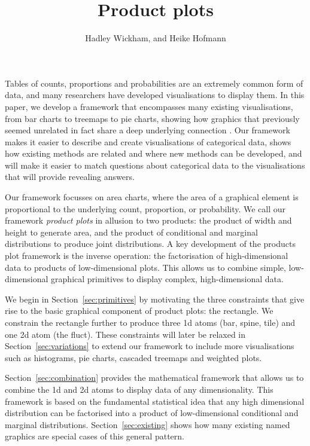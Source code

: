 \documentclass[journal]{vgtc}
\title{Product plots}
\author{Hadley Wickham, and Heike Hofmann}
\begin{document}
\maketitle

Tables of counts, proportions and probabilities are an extremely common form of data, and many researchers have developed visualisations to display them. In this paper, we develop a framework that encompasses many existing visualisations, from bar charts to treemaps to pie charts, showing how graphics that previously seemed unrelated in fact share a deep underlying connection \citep{cox:1978}. Our framework makes it easier to describe and create visualisations of categorical data, shows how existing methods are related and where new methods can be developed, and will make it easier to match questions about categorical data to the visualisations that will provide revealing answers.

Our framework focusses on area charts, where the area of a graphical element is proportional to the underlying count, proportion, or probability. We call our framework \emph{product plots} in allusion to two products: the product of width and height to generate area, and the product of conditional and marginal distributions to produce joint distributions. A key development of the products plot framework is the inverse operation: the factorisation of high-dimensional data to products of low-dimensional plots. This allows us to  combine simple, low-dimensional graphical primitives to display complex, high-dimensional data.

We begin in Section~\ref{sec:primitives} by motivating the three constraints that give rise to the basic graphical component of product plots: the rectangle. We constrain the rectangle further to produce three 1d atoms (bar, spine, tile) and one 2d atom (the fluct). These constraints will later be relaxed in Section~\ref{sec:variations} to extend our framework to include more visualisations such as histograms, pie charts, cascaded treemaps and weighted plots.

Section~\ref{sec:combination} provides the mathematical framework that allows us to combine the 1d and 2d atoms to display data of any dimensionality. This framework is based on the fundamental statistical idea that any high dimensional distribution can be factorised into a product of low-dimensional conditional and marginal distributions. Section~\ref{sec:existing} shows how many existing named graphics are special cases of this general pattern.
\end{document}
